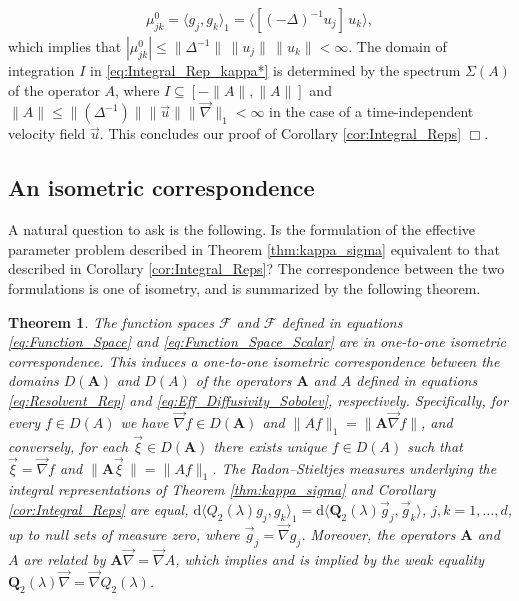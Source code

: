 \documentclass[11pt]{amsart}
\renewcommand{\d}{\mathrm{d}}
\newcommand{\Ab}{\mathbf{A}}
\newcommand{\Qb}{\mathbf{Q}}
\newcommand{\Fc}{\mathcal{F}}
\newcommand{\Fs}{\mathscr{F}}
\newtheorem{theorem}{Theorem}[section]
\begin{document}
% 
\begin{align}\label{eq:Mass_Scalar}
  \mu^0_{jk}
        =\langle g_j,g_k\rangle_1
        =\langle[(-\Delta)^{-1}u_j]\,u_k\rangle,   
\end{align}
%
which implies that
$|\mu^0_{jk}|\leq\|\Delta^{-1}\|\,\|u_j\|\,\|u_k\|<\infty$.  The
domain of integration $I$ in \eqref{eq:Integral_Rep_kappa*} is
determined by the spectrum $\Sigma(A)$ of the operator $A$, where
$I\subseteq[-\|A\|,\|A\|]$ and $\|A\|\leq\|(\Delta^{-1})\|\|\vec{u}\|\|\vec{\nabla}\|_1<\infty$ in the case of a
time-independent velocity field $\vec{u}$. This concludes our proof of
Corollary \ref{cor:Integral_Reps} $\Box$.  



\subsection{An isometric correspondence}\label{sec:Isometric_Correspondence}
%
A natural question to ask is the following. Is the formulation of the
effective parameter problem described in Theorem \ref{thm:kappa_sigma}
equivalent to that described in Corollary \ref{cor:Integral_Reps}?
The correspondence between the two formulations is one of isometry,
and is summarized by the following theorem. 
%
\begin{theorem}\label{thm:Formulation_Equivalence}
%  
The function spaces $\Fs$ and $\Fc$ defined in equations
\eqref{eq:Function_Space} and \eqref{eq:Function_Space_Scalar} are in
one-to-one isometric correspondence. This induces a one-to-one
isometric correspondence between the domains $D(\Ab)$ and $D(A)$ of
the operators $\Ab$ and $A$ defined in equations
\eqref{eq:Resolvent_Rep} and \eqref{eq:Eff_Diffusivity_Sobolev},
respectively. Specifically, for every $f\in D(A)$ we have
$\vec{\nabla}f\in D(\Ab)$ and $\|Af\|_1=\|\Ab\vec{\nabla}f\|$, and conversely, for each
$\vec{\xi}\in D(\Ab)$ there exists unique $f\in D(A)$ such that
$\vec{\xi}=\vec{\nabla}f$  and $\|\Ab\vec{\xi}\,\|=\|Af\|_1$. The Radon--Stieltjes
measures underlying the integral representations of Theorem
\ref{thm:kappa_sigma} and Corollary \ref{cor:Integral_Reps} are equal,
$\d\langle Q_2(\lambda)g_j,g_k\rangle_1=\d\langle\Qb_2(\lambda)\vec{g}_j,\vec{g}_k\rangle$, $j,k=1,\ldots,d$,
up to null sets of measure zero, where
$\vec{g}_j=\vec{\nabla}g_j$. Moreover, the operators $\Ab$ and $A$ are
related by $\Ab\vec{\nabla}=\vec{\nabla}A$, which implies and is implied by the
weak equality $\Qb_2(\lambda)\vec{\nabla}=\vec{\nabla}Q_2(\lambda)$.
%
\end{theorem}
%
\end{document}
